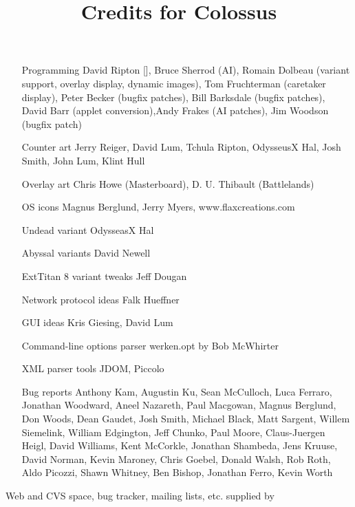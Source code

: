 \documentclass{article}
\begin{document}

\title{Credits for Colossus}

\maketitle

\begin{itemize}

\item[Programming] David Ripton [], Bruce Sherrod (AI), Romain Dolbeau (variant support, overlay display, dynamic images), Tom Fruchterman (caretaker display), Peter Becker (bugfix patches), Bill Barksdale (bugfix patches), David Barr (applet conversion),Andy Frakes (AI patches), Jim Woodson (bugfix patch)

\item[Counter art] Jerry Reiger, David Lum, Tchula Ripton, OdysseusX Hal, Josh Smith, John Lum, Klint Hull

\item[Overlay art] Chris Howe (Masterboard), D. U. Thibault (Battlelands)

\item[OS icons] Magnus Berglund, Jerry Myers, www.flaxcreations.com

\item[Undead variant] OdysseasX Hal

\item[Abyssal variants] David Newell

\item[ExtTitan 8 variant tweaks] Jeff Dougan

\item[Network protocol ideas] Falk Hueffner

\item[GUI ideas] Kris Giesing, David Lum

\item[Command-line options parser] werken.opt by Bob McWhirter

\item[XML parser tools] JDOM, Piccolo

\item[Bug reports] Anthony Kam, Augustin Ku, Sean McCulloch, Luca Ferraro, Jonathan Woodward, Aneel Nazareth, Paul Macgowan, Magnus Berglund, Don Woods, Dean Gaudet, Josh Smith, Michael Black, Matt Sargent, Willem Siemelink, William Edgington, Jeff Chunko, Paul Moore, Claus-Juergen Heigl, David Williams, Kent McCorkle, Jonathan Shambeda, Jens Kruuse, David Norman, Kevin Maroney, Chris Goebel, Donald Walsh, Rob Roth, Aldo Picozzi, Shawn Whitney, Ben Bishop, Jonathan Ferro, Kevin Worth


\end{itemize}

Web and CVS space, bug tracker, mailing lists, etc. supplied by 
\end{document}
